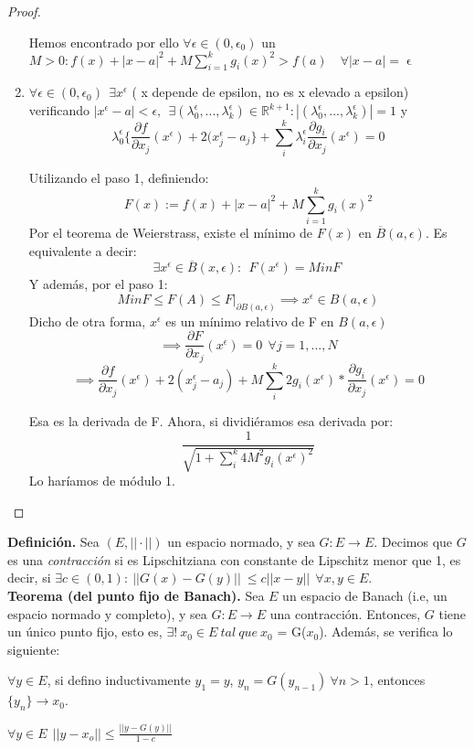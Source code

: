 \begin{proof}
\begin{enumerate}
	Hemos encontrado por ello $\forall \epsilon \in (0,\epsilon_0)$ un $M>0: f(x) + |x-a|^2 + M \sum_{i=1}^kg_i(x)^2 > f(a) \quad \forall |x-a|= \upvarepsilon$
	\item  $\forall \epsilon \in (0,\epsilon_0) \ \ \exists x^\epsilon$ ( x depende de epsilon, no es x elevado a epsilon) verificando $|x^\epsilon -a| < \epsilon, \ \ \exists(\lambda_0^\epsilon,...,\lambda_k^\epsilon)\in \mathbb{R}^{k+1} : |(\lambda_0^{\epsilon},...,\lambda_k^\epsilon)|= 1$ y $$\lambda_0^\epsilon\{\frac{\partial f}{\partial x_j}(x^\epsilon) + 2(x_j^\epsilon -a_j\}+ \sum_i^k \lambda_i^\epsilon \frac{\partial g_i}{\partial x_j}(x^\epsilon) = 0$$

	Utilizando el paso 1, definiendo:
	\[
	F(x):=f(x) + |x-a|^2 + M \sum_{i=1}^kg_i(x)^2
	\]
	Por el teorema de Weierstrass, existe el mínimo de $F(x)$ en $\overline{B}(a,\epsilon)$. Es equivalente a decir:
	\[
	\exists x^\epsilon \in \overline{B}(x,\epsilon) : \ \ F(x^\epsilon)= Min F \
	\]
	Y además, por el paso 1:
	\[
	Min F \leq F(A) \leq F|_{\partial B(a,\epsilon)} \implies x^\epsilon \in B(a,\epsilon)
	\]
	Dicho de otra forma, $x^\epsilon$ es un mínimo relativo de F en $B(a,\epsilon)$
	\[
	 \implies \frac{\partial F}{\partial x_j}(x^\epsilon) = 0 \ \ \forall j=1,...,N
	 \]
	 \[
	 \implies \frac{\partial f}{\partial x_j}(x^\epsilon) + 2(x_j^\epsilon -a_j) + M \sum_i^k 2 g_i(x^\epsilon)*\frac{\partial g_i}{\partial x_j}(x^\epsilon) = 0
	 \]

	Esa es la derivada de F. Ahora, si dividiéramos esa derivada por:
	\[
	\frac{1}{\sqrt{1+\sum_i^k4M^2g_i(x^\epsilon)^2}}
	\]
	Lo haríamos de módulo 1.
\end{enumerate}
\end{proof}

\textbf{Definición.} Sea $(E,||\cdot||)$ un espacio normado, y sea $G: E \longrightarrow E$. Decimos que $G$ es una \textit{contracción} si es Lipschitziana con constante de Lipschitz menor que 1, es decir, si $\exists c \in (0,1): \ || G(x) - G(y) || \ \le c||x-y|| \ \ \forall x, y \in E$.\\

\textbf{Teorema (del punto fijo de Banach).}
Sea $E$ un espacio de Banach (i.e, un espacio normado y completo), y sea $G:E\longrightarrow E$ una contracción. Entonces, $G$ tiene un único punto fijo, esto es, $\exists !\ x_0 \in E\ tal\ que\ x_0$ = G($x_0$). Además, se verifica lo siguiente:

\begin{nlist}
\item $\forall y \in E$, si defino inductivamente $y_1 = y$, $y_n = G(y_{n-1})\ \forall n > 1$, entonces $\{y_n\} \rightarrow x_0$.
\item  $\displaystyle \forall y \in E \ \ ||y - x_o|| \le \frac{||y-G(y)||}{1-c}$
\end{nlist}
\vspace{1em}

